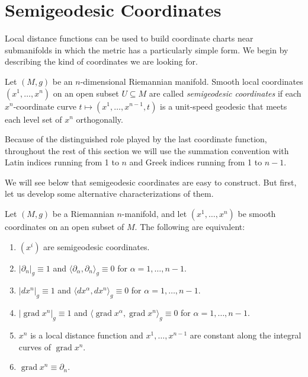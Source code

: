 \section{Semigeodesic Coordinates}

Local distance functions can be used to build coordinate charts near submanifolds in which the metric has a particularly simple form. We begin by describing the kind of coordinates we are looking for.

Let $(M, g)$ be an $n$-dimensional Riemannian manifold. Smooth local coordinates $(x^1, \ldots, x^n)$ on an open subset $U \subseteq M$ are called \emph{semigeodesic coordinates} if each $x^n$-coordinate curve $t \mapsto (x^1, \ldots, x^{n-1}, t)$ is a unit-speed geodesic that meets each level set of $x^n$ orthogonally.

Because of the distinguished role played by the last coordinate function, throughout the rest of this section we will use the summation convention with Latin indices running from 1 to $n$ and Greek indices running from 1 to $n - 1$.

We will see below that semigeodesic coordinates are easy to construct. But first, let us develop some alternative characterizations of them.

\begin{proposition}
\label{prop:characterizations-semigeodetic-coordinates}

Let $(M, g)$ be a Riemannian $n$-manifold, and let $(x^1, \ldots, x^n)$ be smooth coordinates on an open subset of $M$. The following are equivalent:
\begin{enumerate}
  \item[(a)] $(x^i)$ are semigeodesic coordinates.
  \item[(b)] $|\partial_n|_g \equiv 1$ and $\langle\partial_\alpha, \partial_n\rangle_g \equiv 0$ for $\alpha = 1, \ldots, n-1$.
  \item[(c)] $|dx^n|_g \equiv 1$ and $\langle dx^\alpha, dx^n\rangle_g \equiv 0$ for $\alpha = 1, \ldots, n-1$.
  \item[(d)] $|\operatorname{grad} x^n|_g \equiv 1$ and $\langle\operatorname{grad} x^\alpha, \operatorname{grad} x^n\rangle_g \equiv 0$ for $\alpha = 1, \ldots, n-1$.
  \item[(e)] $x^n$ is a local distance function and $x^1, \ldots, x^{n-1}$ are constant along the integral curves of $\operatorname{grad} x^n$.
  \item[(f)] $\operatorname{grad} x^n \equiv \partial_n$.
\end{enumerate}
\end{proposition}

